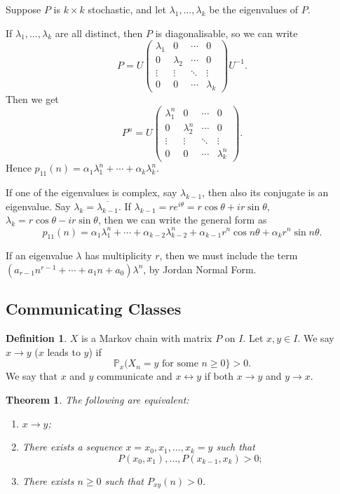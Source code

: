 \documentclass[12pt]{article}
\newtheorem{theorem}{Theorem}[section]
\theoremstyle{definition}
\newtheorem{definition}{Definition}[section]
\theoremstyle{remark}
\begin{document}
Suppose $P$ is $k \times k$ stochastic, and let $\lambda_1, \ldots, \lambda_k$ be the eigenvalues of $P$.

If $\lambda_1, \ldots, \lambda_k$ are all distinct, then $P$ is diagonalisable, so we can write
\[
P = U
\begin{pmatrix}
	\lambda_1 & 0 & \cdots & 0 \\
	0 & \lambda_2 & \cdots & 0 \\
	\vdots & \vdots & \ddots & \vdots \\
	0 & 0 & \cdots & \lambda_k
\end{pmatrix}
U^{-1}
.\]
Then we get
\[
P^{n} = U
\begin{pmatrix}
	\lambda_1^{n} & 0 & \cdots & 0 \\
	0 & \lambda_2^{n} & \cdots & 0 \\
	\vdots & \vdots & \ddots & \vdots \\
	0 & 0 & \cdots & \lambda_k^{n}
\end{pmatrix}
.\]
Hence $p_{11}(n) = \alpha_1 \lambda_1^{n} + \cdots + \alpha_k \lambda_k^{n}$.

If one of the eigenvalues is complex, say $\lambda_{k-1}$, then also its conjugate is an eigenvalue. Say $\lambda_{k} = \overline{\lambda_{k-1}}$. If $\lambda_{k-1} = r e^{i \theta} = r \cos \theta + i r \sin \theta$, $\lambda_k = r \cos \theta - i r \sin \theta$, then we can write the general form as
\[
	p_{11}(n) = \alpha_1 \lambda_1^{n} + \cdots + \alpha_{k-2} \lambda_{k-2}^{n} + \alpha_{k-1} r^{n} \cos n \theta + \alpha_{k} r^{n} \sin n \theta
.\]

If an eigenvalue $\lambda$ has multiplicity $r$, then we must include the term $(a_{r-1}n^{r-1} + \cdots + a_1 n + a_0) \lambda^{n}$, by Jordan Normal Form.

\subsection{Communicating Classes}%
\label{sub:communicating_classes}

\begin{definition}
	$X$ is a Markov chain with matrix $P$ on $I$. Let $x, y \in I$. We say $x \to y$ ($x$ leads to $y$) if
	\[
	\mathbb{P}_x(X_n = y \text{ for some } n \geq 0\} > 0
	.\]
	We say that $x$ and $y$ communicate and $x \leftrightarrow y$ if both $x \to y$ and $y \to x$.
\end{definition}

\begin{theorem}
	The following are equivalent:
	\begin{enumerate}[\normalfont(i)]
		\item $x \to y$;
		\item There exists a sequence $x = x_0, x_1, \ldots, x_k = y$ such that 
			\[P(x_0, x_1), \ldots, P(x_{k-1}, x_k) > 0;\]
		\item There exists $n \geq 0$ such that $P_{xy}(n) > 0$.
	\end{enumerate}	
\end{theorem}
\end{document}
